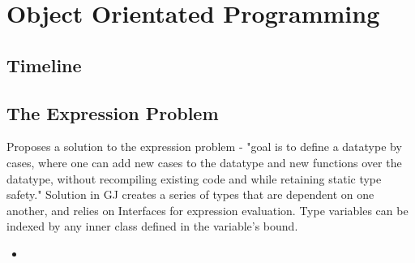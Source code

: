 \chapter {Object Orientated Programming}

\section{Timeline}


\section {The Expression Problem \cite{wadler1998expression}}
Proposes a solution to the expression problem - "goal is to define a datatype by
cases, where one can add new cases to the datatype and new functions over the
datatype, without recompiling existing code and while retaining static type
safety." Solution in GJ creates a series of types that are dependent on one
another, and relies on Interfaces for expression evaluation. Type variables can
be indexed by any inner class defined in the variable's bound.
\begin{itemize}
    \item {}
\end{itemize}